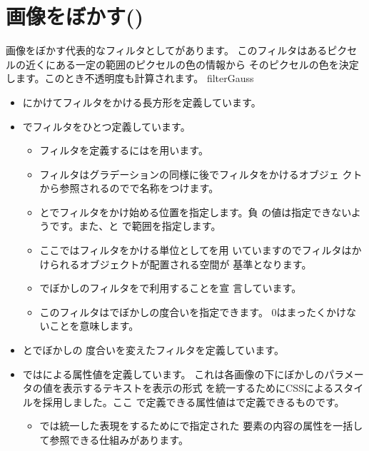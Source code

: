 \section{画像をぼかす()}
画像をぼかす代表的なフィルタとしてがあります。
このフィルタはあるピクセルの近くにある一定の範囲のピクセルの色の情報から
そのピクセルの色を決定します。このとき不透明度も計算されます。
    {}{filterGauss}
\begin{itemize}
 \item {}にかけてフィルタをかける長方形を定義しています。
 \item {}でフィルタをひとつ定義しています。
\begin{itemize}
 \item フィルタを定義するにはを用います。
 \item フィルタはグラデーションの同様に後でフィルタをかけるオブジェ
       クトから参照されるのでで名称をつけます。
 \item {}とでフィルタをかけ始める位置を指定します。負
       の値は指定できないようです。また、と
       で範囲を指定します。
 \item ここではフィルタをかける単位としてを用
       いていますのでフィルタはかけられるオブジェクトが配置される空間が
       基準となります。
 \item {}でぼかしのフィルタをで利用することを宣
       言しています。
 \item このフィルタはでぼかしの度合いを指定できます。
       0はまったくかけないことを意味します。
\end{itemize}
 \item {}とでぼかしの
       度合いを変えたフィルタを定義しています。
 \item {}ではによる属性値を定義しています。
  これは各画像の下にぼかしのパラメータの値を表示するテキストを表示の形式
  を統一するためにCSSによるスタイルを採用しました。ここ
 で定義できる属性値はで定義できるものです。
\begin{itemize}
 \item \HTML では統一した表現をするためにで指定された
 要素の内容の属性を一括して参照できる仕組みがあります。

\end{itemize}
\end{itemize}
